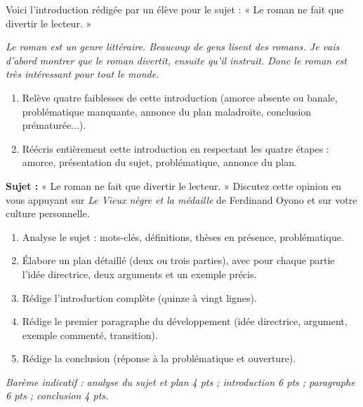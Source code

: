 \documentclass[11pt]{article}
\newcounter{popsec}
\newcounter{popsub}
\newcommand{\courssub}[1]{%
  \stepcounter{popsub}%
  \par\vspace{9pt}\noindent{\popxbold\fontsize{11.5}{13}\selectfont\color{popink}{\color{poporange}\thepopsec.\thepopsub}\hspace{6pt}#1}\par\nopagebreak\vspace{4pt}
}
\begin{document}
\begin{exercice}
Voici l'introduction rédigée par un élève pour le sujet : « Le roman ne fait que divertir le lecteur. »

\emph{Le roman est un genre littéraire. Beaucoup de gens lisent des romans. Je vais d'abord montrer que le roman divertit, ensuite qu'il instruit. Donc le roman est très intéressant pour tout le monde.}
\begin{enumerate}
\item Relève quatre faiblesses de cette introduction (amorce absente ou banale, problématique manquante, annonce du plan maladroite, conclusion prématurée...).
\item Réécris entièrement cette introduction en respectant les quatre étapes : amorce, présentation du sujet, problématique, annonce du plan.
\end{enumerate}
\end{exercice}

\courssub{Je me prépare au Bac}

\begin{exercice}
\textbf{Sujet :} « Le roman ne fait que divertir le lecteur. » Discutez cette opinion en vous appuyant sur \emph{Le Vieux nègre et la médaille} de Ferdinand Oyono et sur votre culture personnelle.

\begin{enumerate}
\item Analyse le sujet : mots-clés, définitions, thèses en présence, problématique.
\item Élabore un plan détaillé (deux ou trois parties), avec pour chaque partie l'idée directrice, deux arguments et un exemple précis.
\item Rédige l'introduction complète (quinze à vingt lignes).
\item Rédige le premier paragraphe du développement (idée directrice, argument, exemple commenté, transition).
\item Rédige la conclusion (réponse à la problématique et ouverture).
\end{enumerate}
\emph{Barème indicatif : analyse du sujet et plan 4 pts ; introduction 6 pts ; paragraphe 6 pts ; conclusion 4 pts.}
\end{exercice}
\end{document}
